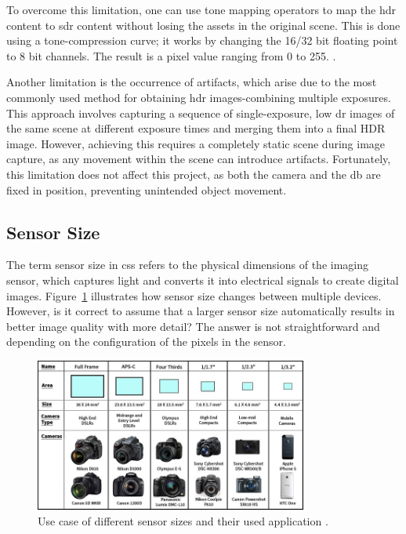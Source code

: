 To overcome this limitation, one can use tone mapping operators to map the \gls{hdr} content to \gls{sdr} content without losing the assets in the original scene. This is done using a tone-compression curve; it works by changing the 16/32 bit floating point to 8 bit channels. The result is a pixel value ranging from 0 to 255. \cite{HDR}.

Another limitation is the occurrence of artifacts, which arise due to the most commonly used method for obtaining \gls{hdr} images-combining multiple exposures. This approach involves capturing a sequence of single-exposure, low \gls{dr} images of the same scene at different exposure times and merging them into a final HDR image. However, achieving this requires a completely static scene during image capture, as any movement within the scene can introduce artifacts. Fortunately, this limitation does not affect this project, as both the camera and the \gls{db} are fixed in position, preventing unintended object movement\cite{Artifact}.

\subsection{Sensor Size}
The term sensor size in \gls{cs}s refers to the physical dimensions of the imaging sensor, which captures light and converts it into electrical signals to create digital images. Figure~\ref{Sen_Size_chart} illustrates how sensor size changes between multiple devices. However, is it correct to assume that a larger sensor size automatically results in better image quality with more detail? The answer is not straightforward and depending on the configuration of the pixels in the sensor. 

\begin{figure}[!ht]
    \centering
    \includegraphics[width=0.8\textwidth]{Figures/sensor-chart.jpg}  
    \caption{Use case of different sensor sizes and their used application \cite{Sen_size_chart}.}
    \label{Sen_Size_chart}
\end{figure}

